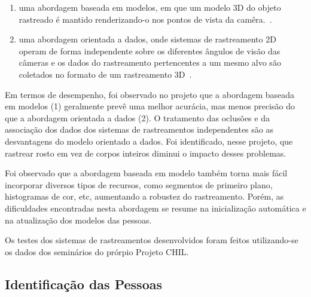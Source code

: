 	\begin{enumerate}
		\item uma abordagem baseada em modelos, em que um modelo 3D do objeto rastreado é mantido renderizando-o nos pontos de vista da camêra.~\cite{chilref1,chilref2,chilref3}.
		\item  uma abordagem orientada a dados, onde sistemas de rastreamento 2D operam de forma independente sobre os diferentes ângulos de visão das câmeras e os dados do rastreamento pertencentes a um mesmo alvo são coletados no formato de um rastreamento 3D~\cite{chilref4,chilref5}.
	\end{enumerate}	

 Em termos de desempenho, foi observado no projeto que a abordagem baseada em modelos (1) geralmente prevê uma melhor acurácia, mas menos precisão do que a abordagem orientada a dados (2).  O tratamento das oclusões e da associação dos dados dos sistemas de rastreamentos independentes são as desvantagens do modelo orientado a dados. Foi identificado,  nesse projeto, que rastrear rosto em vez de corpos inteiros diminui o impacto desses problemas.

 Foi observado que a abordagem baseada em modelo também torna mais fácil incorporar diversos tipos de recursos, como segmentos de primeiro plano, histogramas de cor, etc, aumentando a robustez do rastreamento. Porém, as dificuldades encontradas nesta abordagem se resume na inicialização automática e na atualização dos modelos das pessoas.

 Os testes dos sistemas de rastreamentos desenvolvidos foram feitos utilizando-se os dados dos seminários do prórpio Projeto CHIL.



\subsection{Identificação das Pessoas}


